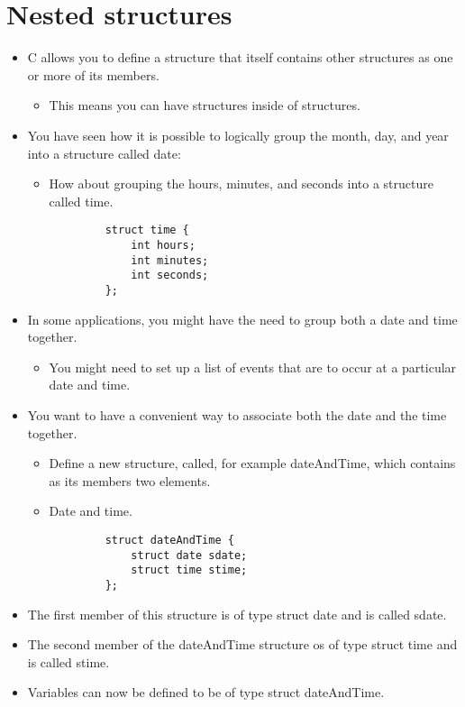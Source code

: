 \section{Nested structures}
\begin{itemize}
    \item C allows you to define a structure that itself contains other structures as one or more of its members. 
        \begin{itemize}
            \item This means you can have structures inside of structures. 
        \end{itemize}
    
    \item You have seen how it is possible to logically group the month, day, and year into a structure called date:
        \begin{itemize}
            \item How about grouping the hours, minutes, and seconds into a structure called time. 
        \end{itemize}
        \begin{verbatim}
            struct time {
                int hours;
                int minutes; 
                int seconds;
            };
        \end{verbatim}
    
    \item In some applications, you might have the need to group both a date and time together.
        \begin{itemize}
            \item You might need to set up a list of events that are to occur at a particular date and time. 
        \end{itemize}
    
    \item You want to have a convenient way to associate both the date and the time together.
        \begin{itemize}
            \item Define a new structure, called, for example dateAndTime, which contains as its members two elements.
            \item Date and time. 
        \end{itemize}
        \begin{verbatim}
            struct dateAndTime {
                struct date sdate;
                struct time stime;
            };
        \end{verbatim}
    
    \item The first member of this structure is of type struct date and is called sdate.
    \item The second member of the dateAndTime structure os of type struct time and is called stime. 
    \item Variables can now be defined to be of type struct dateAndTime. 
\end{itemize}
    
